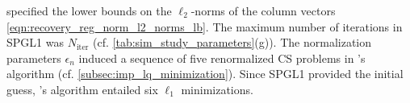 specified
the lower bounds on
the $\ell_{2}$-norms of
the column vectors
\eqref{eqn:recovery_reg_norm_l2_norms_lb}.
The maximum number of
iterations in
\ac{SPGL1} was
$N_{\text{iter}}$
(cf. \cref{tab:sim_study_parameters}(g)).
The normalization parameters
$\epsilon_{n}$ induced
a sequence of
five renormalized \ac{CS} problems in
's algorithm
(cf. \cref{subsec:imp_lq_minimization}).
Since
\ac{SPGL1} provided
the initial guess,
's algorithm entailed
six $\ell_{1}$ minimizations.
